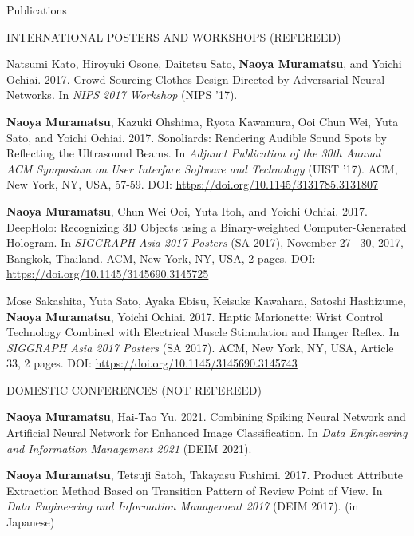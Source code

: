 \documentclass{resume} %
\begin{document}
\begin{rSection}{Publications}
    \begin{rSubsection}{INTERNATIONAL POSTERS AND WORKSHOPS (REFEREED)}{}{}{}{}
        \item Natsumi Kato, Hiroyuki Osone, Daitetsu Sato, \textbf{Naoya Muramatsu}, and Yoichi Ochiai. 2017. Crowd Sourcing Clothes Design Directed by Adversarial Neural Networks. In \textit{NIPS 2017 Workshop} (NIPS ’17).
        \item \textbf{Naoya Muramatsu}, Kazuki Ohshima, Ryota Kawamura, Ooi Chun Wei, Yuta Sato, and Yoichi Ochiai. 2017. Sonoliards: Rendering Audible Sound Spots by Reflecting the Ultrasound Beams. In \textit{Adjunct Publication of the 30th Annual ACM Symposium on User Interface Software and Technology} (UIST ’17). ACM, New York, NY, USA, 57-59. DOI: \url{https://doi.org/10.1145/3131785.3131807}
        \item \textbf{Naoya Muramatsu}, Chun Wei Ooi, Yuta Itoh, and Yoichi Ochiai. 2017. DeepHolo: Recognizing 3D Objects using a Binary-weighted Computer-Generated Hologram. In \textit{SIGGRAPH Asia 2017 Posters} (SA 2017), November 27– 30, 2017, Bangkok, Thailand. ACM, New York, NY, USA, 2 pages. DOI: \url{https://doi.org/10.1145/3145690.3145725}
        \item Mose Sakashita, Yuta Sato, Ayaka Ebisu, Keisuke Kawahara, Satoshi Hashizume, \textbf{Naoya Muramatsu}, Yoichi Ochiai. 2017. Haptic Marionette: Wrist Control Technology Combined with Electrical Muscle Stimulation and Hanger Reflex. In \textit{SIGGRAPH Asia 2017 Posters} (SA 2017). ACM, New York, NY, USA, Article 33, 2 pages. DOI: \url{https://doi.org/10.1145/3145690.3145743}
    \end{rSubsection}



    \begin{rSubsection}{DOMESTIC CONFERENCES (NOT REFEREED)}{}{}{}{}
        \item \textbf{Naoya Muramatsu}, Hai-Tao Yu. 2021. Combining Spiking Neural Network and Artificial Neural Network for Enhanced Image Classification. In \textit{Data Engineering and Information Management 2021} (DEIM 2021).
        \item \textbf{Naoya Muramatsu}, Tetsuji Satoh, Takayasu Fushimi. 2017. Product Attribute Extraction Method Based on Transition Pattern of Review Point of View. In \textit{Data Engineering and Information Management 2017} (DEIM 2017). (in Japanese) %
    \end{rSubsection}

\end{rSection}
\end{document}

